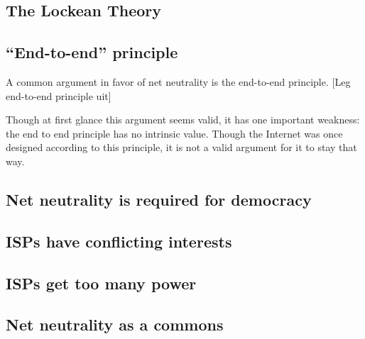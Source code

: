 
\subsection{The Lockean Theory}

\subsection{``End-to-end'' principle}
A common argument in favor of net neutrality is the end-to-end principle. [Leg end-to-end principle uit] \cite{iskander2010end}

Though at first glance this argument seems valid, it has one important weakness: the end to end principle has no intrinsic value. Though the Internet was once designed according to this principle, it is not a valid argument for it to stay that way.



\subsection{Net neutrality is required for democracy}


\subsection{\acp{ISP} have conflicting interests}

\subsection{\acp{ISP} get too many power}

\subsection{Net neutrality as a commons}

